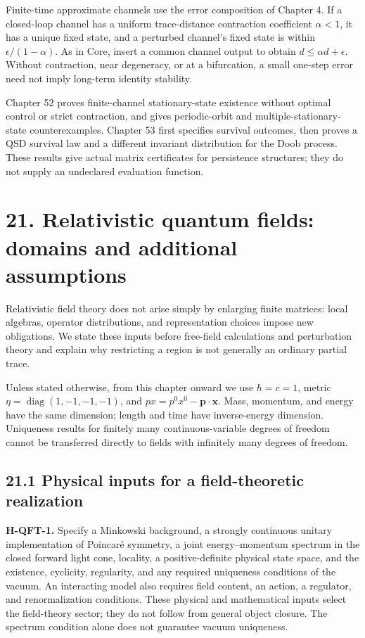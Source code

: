 \documentclass[
  11pt,
  oneside]{book}
\begin{document}
Finite-time approximate channels use the error composition of Chapter 4.
If a closed-loop channel has a uniform trace-distance contraction
coefficient \(\alpha<1\), it has a unique fixed state, and a perturbed
channel's fixed state is within \(\epsilon/(1-\alpha)\). As in Core,
insert a common channel output to obtain \(d\le\alpha d+\epsilon\).
Without contraction, near degeneracy, or at a bifurcation, a small
one-step error need not imply long-term identity stability.

Chapter 52 proves finite-channel stationary-state existence without
optimal control or strict contraction, and gives periodic-orbit and
multiple-stationary-state counterexamples. Chapter 53 first specifies
survival outcomes, then proves a QSD survival law and a different
invariant distribution for the Doob process. These results give actual
matrix certificates for persistence structures; they do not supply an
undeclared evaluation function.

\chapter{21. Relativistic quantum fields: domains and additional
assumptions}\label{ch-21}

Relativistic field theory does not arise simply by enlarging finite
matrices: local algebras, operator distributions, and representation
choices impose new obligations. We state these inputs before free-field
calculations and perturbation theory and explain why restricting a
region is not generally an ordinary partial trace.

Unless stated otherwise, from this chapter onward we use \(\hbar=c=1\),
metric \(\eta=\operatorname{diag}(1,-1,-1,-1)\), and
\(p x=p^0x^0-\mathbf p\cdot\mathbf x\). Mass, momentum, and energy have
the same dimension; length and time have inverse-energy dimension.
Uniqueness results for finitely many continuous-variable degrees of
freedom cannot be transferred directly to fields with infinitely many
degrees of freedom.

\section{21.1 Physical inputs for a field-theoretic realization}

\textbf{H-QFT-1.} Specify a Minkowski background, a strongly continuous
unitary implementation of Poincaré symmetry, a joint energy--momentum
spectrum in the closed forward light cone, locality, a positive-definite
physical state space, and the existence, cyclicity, regularity, and any
required uniqueness conditions of the vacuum. An interacting model also
requires field content, an action, a regulator, and renormalization
conditions. These physical and mathematical inputs select the
field-theory sector; they do not follow from general object closure. The
spectrum condition alone does not guarantee vacuum uniqueness.
\end{document}
